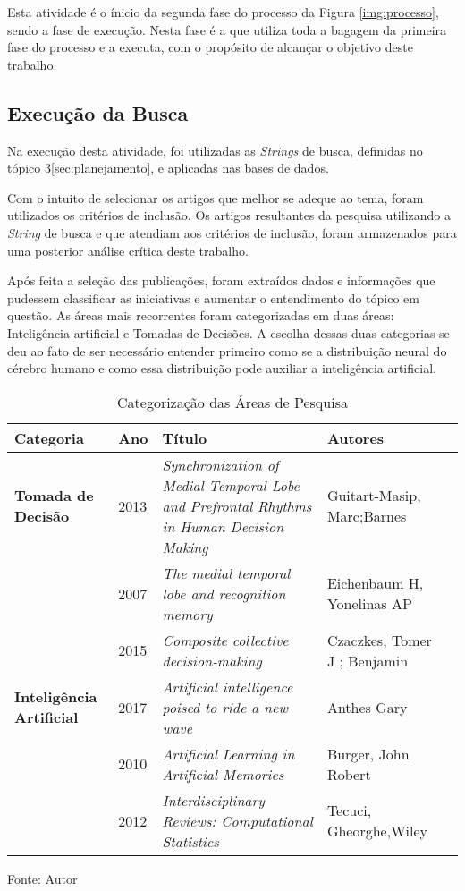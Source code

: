 Esta atividade é o ínicio da segunda fase do processo da Figura \ref{img:processo}, sendo a fase de execução. Nesta fase é a que utiliza toda a bagagem da primeira fase do processo e a executa, com o propósito de alcançar o objetivo deste trabalho.

\subsection{Execução da Busca}
\label{subsec:busca}

Na execução desta atividade, foi utilizadas as \textit{Strings} de busca, definidas no tópico 3\ref{sec:planejamento}, e aplicadas nas bases de dados.

Com o intuito de selecionar os artigos que melhor se adeque ao tema, foram utilizados os critérios de inclusão. Os artigos resultantes da pesquisa utilizando a \textit{String} de busca e que atendiam aos critérios de inclusão, foram armazenados para uma posterior análise crítica deste trabalho.

Após feita a seleção das publicações, foram extraídos dados e informações que pudessem classificar as iniciativas e aumentar o entendimento do tópico em questão. As áreas mais recorrentes foram categorizadas em duas áreas: Inteligência artificial e Tomadas de Decisões. A escolha dessas duas categorias se deu ao fato de ser necessário entender primeiro como se a distribuição neural do cérebro humano e como essa distribuição pode auxiliar a inteligência artificial.

\begin{table}[h]
\centering
\caption{Categorização das Áreas de Pesquisa}
\begin{tabular}{ | l | l | p{5cm} | l | p{10cm} |}
\hline
\rowcolor[HTML]{F8FF00} 
{\color[HTML]{000000} \textbf{Categoria}} & \textbf{Ano} & \textbf{Título} & \textbf{Autores}        \\ \hline
{\cellcolor[HTML]{34FF34}}\textbf{Tomada de Decisão}               & 2013                   & \textit{Synchronization of Medial Temporal Lobe and Prefrontal Rhythms in Human Decision Making}    & Guitart-Masip, Marc;Barnes          \\ \hline
 & 2007 & \textit{The medial temporal lobe and recognition memory} & Eichenbaum H, Yonelinas AP\\ \hline
 & 2015 & \textit{Composite collective decision-making} & Czaczkes, Tomer J ; Benjamin \\ \hline
 {\cellcolor[HTML]{34FF34}}\textbf{Inteligência Artificial} & 2017 & \textit{Artificial intelligence poised to ride a new wave} & Anthes Gary \\ \hline
 & 2010 & \textit{Artificial Learning in Artificial Memories} & Burger, John Robert \\ \hline
 & 2012 & \textit{Interdisciplinary Reviews: Computational Statistics} & Tecuci, Gheorghe,Wiley \\ \hline
\end{tabular}
Fonte: Autor
\label{tab:categorizacao}
\end{table}